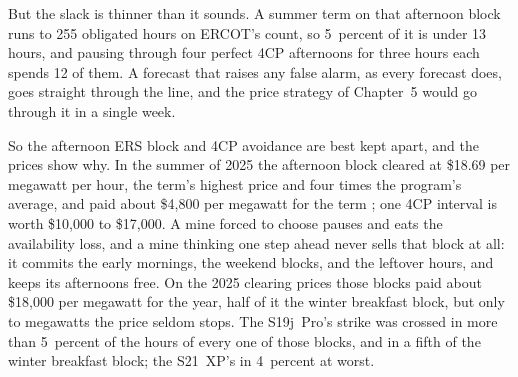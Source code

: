 But the slack is thinner than it sounds. A summer term on that afternoon block runs to 255 obligated hours on ERCOT's count, so 5~percent of it is under 13 hours, and pausing through four perfect 4CP afternoons for three hours each spends 12 of them. %
A forecast that raises any false alarm, as every forecast does, goes straight through the line, and the price strategy of Chapter~5 would go through it in a single week.

So the afternoon ERS block and 4CP avoidance are best kept apart, and the prices show why. In the summer of 2025 the afternoon block cleared at \$18.69 per megawatt per hour, the term's highest price and four times the program's average, and paid about \$4,800 per megawatt for the term \autocite{ercotersproc2025}; one 4CP interval is worth \$10,000 to \$17,000. %
A mine forced to choose pauses and eats the availability loss, and a mine thinking one step ahead never sells that block at all: it commits the early mornings, the weekend blocks, and the leftover hours, and keeps its afternoons free. On the 2025 clearing prices those blocks paid about \$18,000 per megawatt for the year, half of it the winter breakfast block, but only to megawatts the price seldom stops. The S19j~Pro's strike was crossed in more than 5~percent of the hours of every one of those blocks, and in a fifth of the winter breakfast block; the S21~XP's in 4~percent at worst. %
